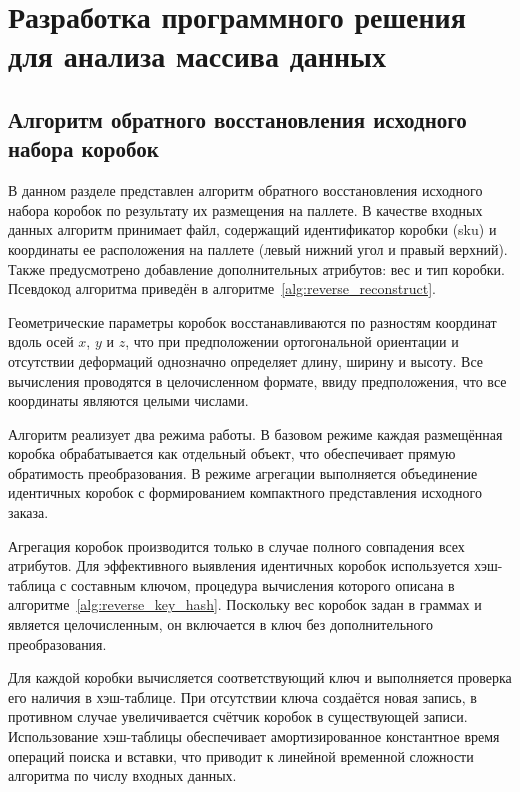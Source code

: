 \section{Разработка программного решения для анализа массива данных}

\subsection{Алгоритм обратного восстановления исходного набора коробок}

В данном разделе представлен алгоритм обратного восстановления исходного набора коробок по результату их размещения на паллете. В качестве входных данных алгоритм принимает файл, содержащий идентификатор коробки (sku) и координаты ее расположения на паллете (левый нижний угол и правый верхний). Также предусмотрено добавление дополнительных атрибутов: вес и тип коробки. Псевдокод алгоритма приведён в алгоритме~\ref{alg:reverse_reconstruct}.

Геометрические параметры коробок восстанавливаются по разностям координат вдоль осей $x$, $y$ и $z$, что при предположении ортогональной ориентации и отсутствии деформаций однозначно определяет длину, ширину и высоту. Все вычисления проводятся в целочисленном формате, ввиду предположения, что все координаты являются целыми числами.

Алгоритм реализует два режима работы. В базовом режиме каждая размещённая коробка обрабатывается как отдельный объект, что обеспечивает прямую обратимость преобразования. В режиме агрегации выполняется объединение идентичных коробок с формированием компактного представления исходного заказа.

Агрегация коробок производится только в случае полного совпадения всех атрибутов. Для эффективного выявления идентичных коробок используется хэш-таблица с составным ключом, процедура вычисления которого описана в алгоритме~\ref{alg:reverse_key_hash}. Поскольку вес коробок задан в граммах и является целочисленным, он включается в ключ без дополнительного преобразования.

Для каждой коробки вычисляется соответствующий ключ и выполняется проверка его наличия в хэш-таблице. При отсутствии ключа создаётся новая запись, в противном случае увеличивается счётчик коробок в существующей записи. Использование хэш-таблицы обеспечивает амортизированное константное время операций поиска и вставки, что приводит к линейной временной сложности алгоритма по числу входных данных.


